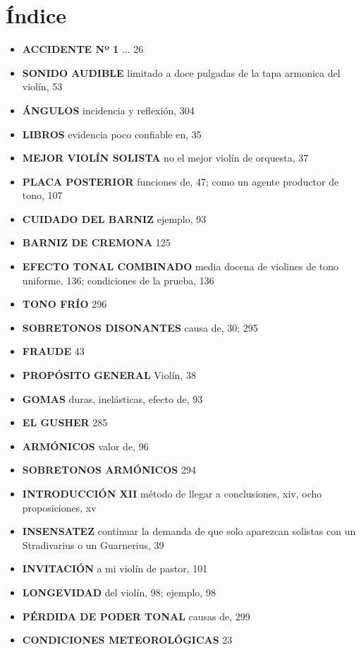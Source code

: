 \documentclass[12pt]{book}
\begin{document}
\chapter*{Índice}

\begin{itemize}
    \item \textbf{ACCIDENTE Nº 1} ... 26
    \item \textbf{SONIDO AUDIBLE} limitado a doce pulgadas de la tapa armonica del violín, 53
    \item \textbf{ÁNGULOS} incidencia y reflexión, 304
    \item \textbf{LIBROS} evidencia poco confiable en, 35
    \item \textbf{MEJOR VIOLÍN SOLISTA} no el mejor violín de orquesta, 37
    \item \textbf{PLACA POSTERIOR} funciones de, 47; como un agente productor de tono, 107
    \item \textbf{CUIDADO DEL BARNIZ} ejemplo, 93
    \item \textbf{BARNIZ DE CREMONA} 125
    \item \textbf{EFECTO TONAL COMBINADO} media docena de violines de tono uniforme, 136; condiciones de la prueba, 136
    \item \textbf{TONO FRÍO} 296
    \item \textbf{SOBRETONOS DISONANTES} causa de, 30; 295
    \item \textbf{FRAUDE} 43
    \item \textbf{PROPÓSITO GENERAL} Violín, 38
    \item \textbf{GOMAS} duras, inelásticas, efecto de, 93
    \item \textbf{EL GUSHER} 285
    \item \textbf{ARMÓNICOS} valor de, 96
    \item \textbf{SOBRETONOS ARMÓNICOS} 294
    \item \textbf{INTRODUCCIÓN XII} método de llegar a conclusiones, xiv, ocho proposiciones, xv
    \item \textbf{INSENSATEZ} continuar la demanda de que solo aparezcan solistas con un Stradivarius o un Guarnerius, 39
    \item \textbf{INVITACIÓN} a mi violín de pastor, 101
    \item \textbf{LONGEVIDAD} del violín, 98; ejemplo, 98
    \item \textbf{PÉRDIDA DE PODER TONAL} causas de, 299
    \item \textbf{CONDICIONES METEOROLÓGICAS} 23

\end{itemize}
\end{document}
